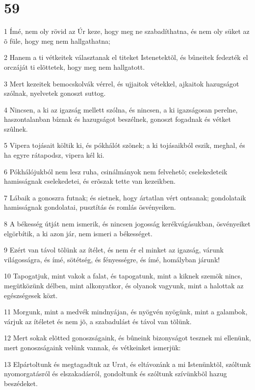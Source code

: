 \chapter{59}

\par 1 Ímé, nem oly rövid az Úr keze, hogy meg ne szabadíthatna, és nem oly süket az õ füle, hogy meg nem hallgathatna;
\par 2 Hanem a ti vétkeitek választanak el titeket Istenetektõl, és bûneitek fedezték el orczáját ti elõttetek, hogy meg nem hallgatott.
\par 3 Mert kezeitek bemocskolvák vérrel, és ujjaitok vétekkel, ajkaitok hazugságot szólnak, nyelvetek gonoszt suttog.
\par 4 Nincsen, a ki az igazság mellett szólna, és nincsen, a ki igazságosan perelne, haszontalanban bíznak és hazugságot beszélnek, gonoszt fogadnak és vétket szûlnek.
\par 5 Vipera tojásait költik ki, és pókhálót szõnek; a ki tojásaikból eszik, meghal, és ha egyre rátapodsz, vipera kél ki.
\par 6 Pókhálójukból nem lesz ruha, csinálmányok nem felvehetõ; cselekedeteik hamisságnak cselekedetei, és erõszak tette van kezeikben.
\par 7 Lábaik a gonoszra futnak; és sietnek, hogy ártatlan vért ontsanak; gondolataik hamisságnak gondolatai, pusztítás és romlás ösvényeiken.
\par 8 A békesség útját nem ismerik, és nincsen jogosság kerékvágásukban, ösvényeiket elgörbítik, a ki azon jár, nem ismeri a békességet.
\par 9 Ezért van távol tõlünk az ítélet, és nem ér el minket az igazság, várunk világosságra, és ímé, sötétség, és fényességre, és ímé, homályban járunk!
\par 10 Tapogatjuk, mint vakok a falat, és tapogatunk, mint a kiknek szemök nincs, megütközünk délben, mint alkonyatkor, és olyanok vagyunk, mint a halottak az egészségesek közt.
\par 11 Morgunk, mint a medvék mindnyájan, és nyögvén nyögünk, mint a galambok, várjuk az ítéletet és nem jõ, a szabadulást és távol van tõlünk.
\par 12 Mert sokak elõtted gonoszságaink, és bûneink bizonyságot tesznek mi ellenünk, mert gonoszságaink velünk vannak, és vétkeinket ismerjük:
\par 13 Elpártoltunk és megtagadtuk az Urat, és eltávozánk a mi Istenünktõl, szóltunk nyomorgatásról és elszakadásról, gondoltunk és szóltunk szívünkbõl hazug beszédeket.
